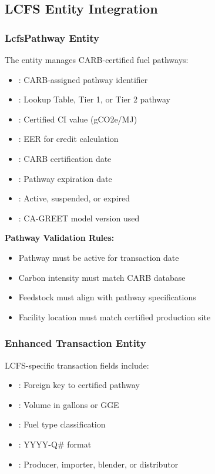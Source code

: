 \subsection{LCFS Entity Integration}
\label{sec:lcfs-entities}

\subsubsection{LcfsPathway Entity}

The  entity manages CARB-certified fuel pathways:

\begin{itemize}
    \item {}: CARB-assigned pathway identifier
    \item {}: Lookup Table, Tier 1, or Tier 2 pathway
    \item {}: Certified CI value (gCO2e/MJ)
    \item {}: EER for credit calculation
    \item {}: CARB certification date
    \item {}: Pathway expiration date
    \item {}: Active, suspended, or expired
    \item {}: CA-GREET model version used
\end{itemize}

\textbf{Pathway Validation Rules:}
\begin{itemize}
    \item Pathway must be active for transaction date
    \item Carbon intensity must match CARB database
    \item Feedstock must align with pathway specifications
    \item Facility location must match certified production site
\end{itemize}

\subsubsection{Enhanced Transaction Entity}

LCFS-specific transaction fields include:

\begin{itemize}
    \item {}: Foreign key to certified pathway
    \item {}: Volume in gallons or GGE
    \item {}: Fuel type classification
    \item {}: YYYY-Q\# format
    \item {}: Producer, importer, blender, or distributor
\end{itemize}

